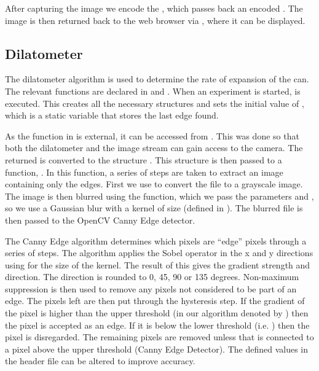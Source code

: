 After capturing the image we encode the , which passes back an encoded . The image is then returned back to the web browser via , where it can be displayed.  

\subsection{Dilatometer}

The dilatometer algorithm is used to determine the rate of expansion of the can. The relevant functions are declared in  and . When an experiment is started,  is  executed.  This creates all the necessary structures and sets the initial value of , which is a static variable that stores the last edge found.

As the  function in  is external, it can be accessed from .  This was done so that both the dilatometer and the image stream can gain access to the camera.  The  returned is converted to the  structure .  This  structure is then passed to a function, .  In this function, a series of steps are taken to extract an image containing only the edges.  First we use  to convert the  file to a grayscale image.  The image is then blurred using the  function, which we pass the parameters  and , so  we use a Gaussian blur with a kernel of size  (defined in ).  The blurred file is then passed to the OpenCV Canny Edge detector.  

The Canny Edge algorithm\cite{OpenCV_Canny} determines which pixels are ``edge'' pixels through a series of steps.  The algorithm applies the Sobel operator in the x and y directions using  for the size of the kernel.  The result of this gives the gradient strength and direction. The direction is rounded to 0, 45, 90 or 135 degrees. Non-maximum suppression is then used to remove any pixels not considered to be part of an edge.  The pixels left are then put through the hysteresis step.  If the gradient of the pixel is higher than the upper threshold (in our algorithm denoted by ) then the pixel is accepted as an edge.  If it is below the lower threshold (i.e. ) then the pixel is disregarded.  The remaining pixels are removed unless that is connected to a pixel above the upper threshold (Canny Edge Detector). The defined values in the header file can be altered to improve accuracy.

